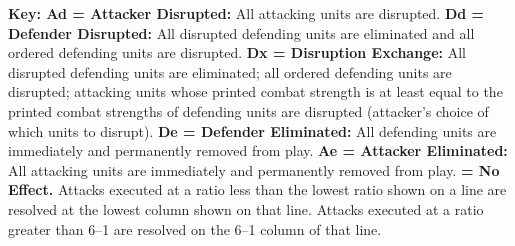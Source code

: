 \begin{tcolorbox}[colback=cvsand!35,colframe=cvblue,boxrule=.6pt,arc=1pt]
\centering
\scriptsize
{}

\raggedright\smallskip
\textbf{Key: Ad = Attacker Disrupted:} All attacking units are disrupted.
\textbf{Dd = Defender Disrupted:} All disrupted defending units are eliminated and all ordered defending units are disrupted.
\textbf{Dx = Disruption Exchange:} All disrupted defending units are eliminated; all ordered defending units are disrupted; attacking units whose printed combat strength is at least equal to the printed combat strengths of defending units are disrupted (attacker's choice of which units to disrupt).
\textbf{De = Defender Eliminated:} All defending units are immediately and permanently removed from play.
\textbf{Ae = Attacker Eliminated:} All attacking units are immediately and permanently removed from play.
\textbf{\dash{} = No Effect.} Attacks executed at a ratio less than the lowest ratio shown on a line are resolved at the lowest column shown on that line. Attacks executed at a ratio greater than 6--1 are resolved on the 6--1 column of that line.
\end{tcolorbox}
